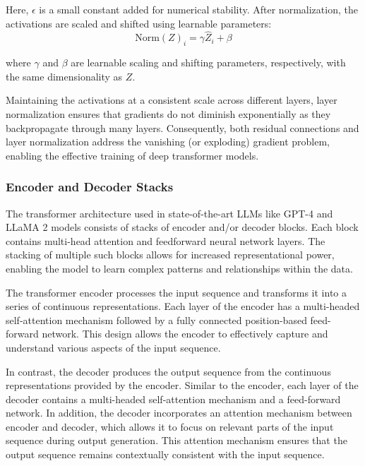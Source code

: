 Here, \( \epsilon \) is a small constant added for numerical stability. After normalization, the activations are scaled and shifted using learnable parameters:
\begin{equation}
\text{Norm}(Z)_i = \gamma \hat{Z}_i + \beta
\end{equation}

where \( \gamma \) and \( \beta \) are learnable scaling and shifting parameters, respectively, with the same dimensionality as \( Z \).

Maintaining the activations at a consistent scale across different layers, layer normalization ensures that gradients do not diminish exponentially as they backpropagate through many layers. Consequently, both residual connections and layer normalization address the vanishing (or exploding) gradient problem, enabling the effective training of deep transformer models.

\subsubsection{Encoder and Decoder Stacks}

The transformer architecture used in state-of-the-art LLMs like GPT-4 \cite{achiam2023gpt} and LLaMA 2 \cite{touvron2023llama} models consists of stacks of encoder and/or decoder blocks. Each block contains multi-head attention and feedforward neural network layers. The stacking of multiple such blocks allows for increased representational power, enabling the model to learn complex patterns and relationships within the data.

The transformer encoder processes the input sequence and transforms it into a series of continuous representations. Each layer of the encoder has a multi-headed self-attention mechanism followed by a fully connected position-based feed-forward network. This design allows the encoder to effectively capture and understand various aspects of the input sequence.

In contrast, the decoder produces the output sequence from the continuous representations provided by the encoder. Similar to the encoder, each layer of the decoder contains a multi-headed self-attention mechanism and a feed-forward network. In addition, the decoder incorporates an attention mechanism between encoder and decoder, which allows it to focus on relevant parts of the input sequence during output generation. This attention mechanism ensures that the output sequence remains contextually consistent with the input sequence.


